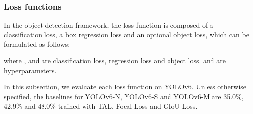 \documentclass[10pt,twocolumn,letterpaper]{article}
\begin{document}
\subsubsection{Loss functions}
\label{sec:exp:ablate:loss}
In the object detection framework, the loss function is composed of a classification loss, a box regression loss and an optional object loss, which can be formulated as follows:

where ,  and  are classification loss, regression loss and object loss.  and  are hyperparameters. 

In this subsection, we evaluate each loss function on YOLOv6. Unless otherwise specified, the baselines for YOLOv6-N, YOLOv6-S and YOLOv6-M are 35.0\%, 42.9\% and 48.0\% trained with TAL, Focal Loss and GIoU Loss.


\begin{table}
  \centering
\caption{Ablation study on classification loss functions.}
\label{tab:ablate:clsloss}
\end{table}
\end{document}
